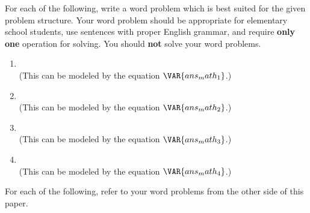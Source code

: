 
For each of the following, write a word problem which is best suited for the given problem structure. Your word problem should be appropriate for elementary school students, use sentences with proper English grammar, and require \textbf{only one} operation for solving. You should \textbf{not} solve your word problems.

\begin{enumerate}

    \item {}

    \vfill
    \begin{ansenv}
        \\

        (This can be modeled by the equation $\VAR{ans_math_1}$.)
    \end{ansenv}
    \vfill

    \item {}

    \vfill
    \begin{ansenv}
        \\

        (This can be modeled by the equation $\VAR{ans_math_2}$.)
    \end{ansenv}
    \vfill

    \item {}

    \vfill
    \begin{ansenv}
        \\

        (This can be modeled by the equation $\VAR{ans_math_3}$.)
    \end{ansenv}
    \vfill

    \item {}

    \vfill
    \begin{ansenv}
        \\

        (This can be modeled by the equation $\VAR{ans_math_4}$.)
    \end{ansenv}
    \vfill

\end{enumerate}


\newpage
{}

For each of the following, refer to your word problems from the other side of this paper.


